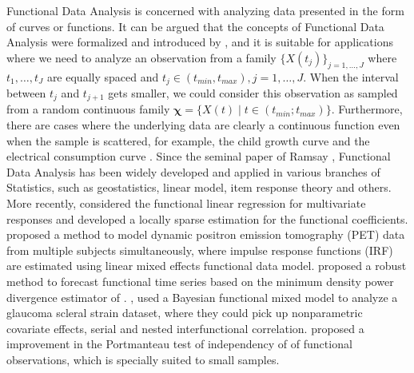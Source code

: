 \documentclass[12pt]{interact}
\theoremstyle{plain}%
\theoremstyle{definition}
\theoremstyle{remark}
\begin{document}
Functional Data Analysis is concerned with analyzing data presented in the form of curves or functions. It can be argued that the concepts of Functional Data Analysis were formalized and introduced
by \citet{ramsay1991some}, and it is suitable for applications where we need to analyze an observation from a family \(\{X(t_j)\}_{j=1, \dots, J}\) where \(t_1, \dots, t_J\) are equally spaced and \(t_j \in (t_{min}, t_{max}), j=1, \dots, J\). When the interval between \(t_j\) and \(t_{j+1}\) gets smaller, we could consider this observation as sampled from a random continuous family \(\bm{\chi} = \{X(t) \mid t \in (t_{min}; t_{max}) \}\).
Furthermore, there are cases where the underlying data are clearly a continuous function even when the sample is scattered, for example, the child growth curve and the
electrical consumption curve \citep{ferraty2006nonparametric}.
Since the seminal paper of Ramsay \citet{ramsay1991some},
Functional Data Analysis has been widely developed and applied in various branches of Statistics, such as geostatistics, linear model, item response theory and others. More recently, \citet{kuangman2020} considered the functional linear regression for multivariate responses and developed a locally sparse estimation for the functional coefficients. \citet{chen2018} proposed a method to model dynamic positron emission tomography (PET) data from multiple subjects simultaneously, where impulse response functions (IRF) are estimated using linear mixed effects functional data model. \citet{beyaztas2019forecasting} proposed a robust method to forecast functional time series based on the minimum density power divergence estimator of \citet{basu1998robust}. \citet{lee2019bayesian}, used a Bayesian functional mixed model to analyze a glaucoma scleral strain dataset, where they could pick up nonparametric covariate effects, serial and nested interfunctional correlation. \citet{zamani2019improved} proposed a improvement in the Portmanteau test of independency of \citet{gabrys2007portmanteau} of functional observations, which is specially suited to small samples.
\end{document}
